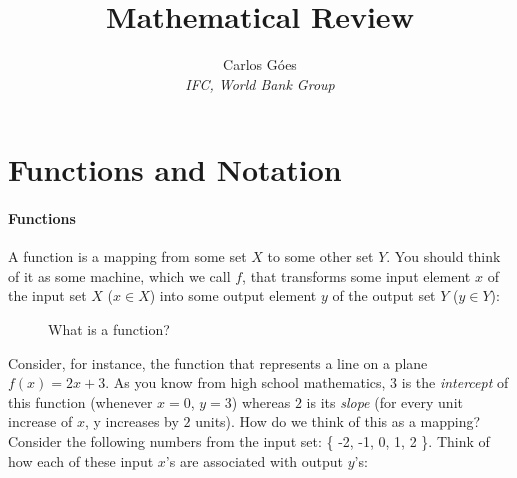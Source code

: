 \documentclass[11pt,letterpaper]{article}
\begin{document}
\title{\textbf{Mathematical Review}}
\author{\large%
\setcounter{footnote}{0}%
Carlos G\'{o}es \\[-3pt] \textit{\small IFC, World Bank Group}
}
\maketitle

\section{Functions and Notation}

\paragraph{Functions} A function is a mapping from some set $X$ to some other set $Y$. You should think of it as some machine, which we call $f$, that transforms some input element $x$ of the input set $X$ ($x \in X$) into some output element $y$ of the output set $Y$ ($y \in Y$):

\begin{figure}[htp]
    \centering
{}
    \caption{What is a function?}
    \label{fig:functions}
\end{figure}

Consider, for instance, the function that represents a line on a plane $f(x) = 2x + 3$. As you know from high school mathematics, $3$ is the \textit{intercept} of this function (whenever $x=0$, $y=3$) whereas $2$ is its \textit{slope} (for every unit increase of $x$, y increases  by $2$ units). How do we think of this as a mapping? Consider the following numbers from the input set: \{ -2, -1, 0, 1, 2 \}. Think of how each of these input $x$'s are associated with output $y$'s:
\end{document}
